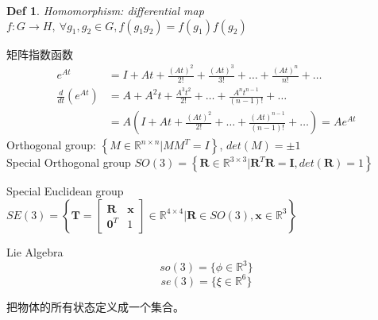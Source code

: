 \documentclass[12pt]{article}
\newtheorem{definition}{Def}[section]
\begin{document}
        \begin{definition}
            Homomorphism: differential map $f:G\rightarrow H,\ \forall g_{1},g_{2}\in G,f(g_{1}g_{2})=f(g_{1})f(g_{2})$ 
        \end{definition}


        矩阵指数函数
        \begin{equation*}
            \begin{aligned}
                e^{At}&=I+At+\frac{(At)^2}{2!}+\frac{(At)^3}{3!}+\dots+\frac{(At)^n}{n!}+\dots\\
                \frac{d}{dt}(e^{At})&=A+A^2t+\frac{A^3t^2}{2!}+\dots+\frac{A^nt^{n-1}}{(n-1)!}+\dots\\
                &=A(I+At+\frac{(At)^2}{2!}+\dots+\frac{(At)^{n-1}}{(n-1)!}+\dots)=Ae^{At}
            \end{aligned}
        \end{equation*}
        \indent Orthogonal group: $\left\{M\in \mathbb{R}^{n\times n}|MM^T=I\right\}$, $det(M)=\pm 1$\\
        \indent Special Orthogonal group
        $SO(3)=\left\{\mathbf{R}\in\mathbb{R}^{3 \times 3}|
        \mathbf{R}^T\mathbf{R}=\mathbf{I},det(\mathbf{R})=1\right\}$
        
        \indent Special Euclidean group
        $SE(3)=\left\{\mathbf{T}=\begin{bmatrix}
            \mathbf{R} & \mathbf{x}\\
            \mathbf{0}^T & 1
        \end{bmatrix}\in\mathbb{R}^{4 \times 4}|\mathbf{R}\in SO(3),\mathbf{x}\in \mathbb{R}^{3}\right\}$
        
        \indent Lie Algebra
        $$so(3)=\{\phi\in \mathbb{R}^3\}$$
        $$se(3)=\{\xi\in \mathbb{R}^6\}$$

        把物体的所有状态定义成一个集合。
    
\end{document}

